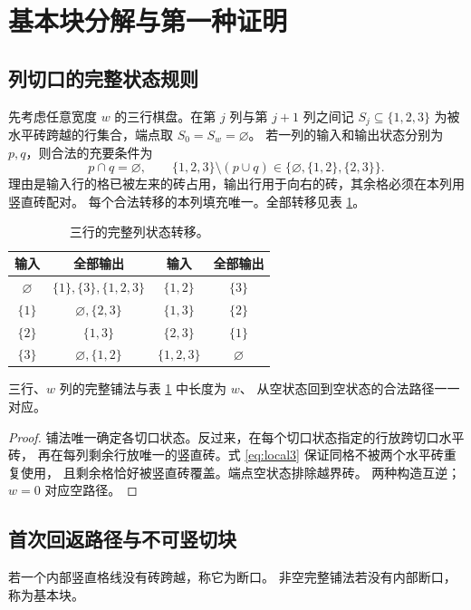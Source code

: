 \section{基本块分解与第一种证明}\label{sec:blocks}

\subsection{列切口的完整状态规则}
先考虑任意宽度 $w$ 的三行棋盘。在第 $j$ 列与第 $j+1$ 列之间记
$S_j\subseteq\{1,2,3\}$ 为被水平砖跨越的行集合，端点取
$S_0=S_w=\varnothing$。
若一列的输入和输出状态分别为 $p,q$，则合法的充要条件为
\begin{equation}\label{eq:local3}
 p\cap q=\varnothing,\qquad
 \{1,2,3\}\setminus(p\cup q)\in
 \{\varnothing,\{1,2\},\{2,3\}\}.
\end{equation}
理由是输入行的格已被左来的砖占用，输出行用于向右的砖，其余格必须在本列用竖直砖配对。
每个合法转移的本列填充唯一。全部转移见表 \ref{tab:states}。

\begin{table}[htbp]
\centering
\caption{三行的完整列状态转移。}\label{tab:states}
\begin{tabular}{cc@{\qquad}cc}
\toprule
输入 & 全部输出 & 输入 & 全部输出\\
\midrule
$\varnothing$ & $\{1\},\{3\},\{1,2,3\}$ &
$\{1,2\}$ & $\{3\}$\\
$\{1\}$ & $\varnothing,\{2,3\}$ &
$\{1,3\}$ & $\{2\}$\\
$\{2\}$ & $\{1,3\}$ &
$\{2,3\}$ & $\{1\}$\\
$\{3\}$ & $\varnothing,\{1,2\}$ &
$\{1,2,3\}$ & $\varnothing$\\
\bottomrule
\end{tabular}
\end{table}

\begin{lemma}\label{lem:path}
三行、$w$ 列的完整铺法与表 \ref{tab:states} 中长度为 $w$、
从空状态回到空状态的合法路径一一对应。
\end{lemma}
\begin{proof}
铺法唯一确定各切口状态。反过来，在每个切口状态指定的行放跨切口水平砖，
再在每列剩余行放唯一的竖直砖。式 \eqref{eq:local3} 保证同格不被两个水平砖重复使用，
且剩余格恰好被竖直砖覆盖。端点空状态排除越界砖。
两种构造互逆；$w=0$ 对应空路径。
\end{proof}

\subsection{首次回返路径与不可竖切块}
\begin{definition}
若一个内部竖直格线没有砖跨越，称它为断口。
非空完整铺法若没有内部断口，称为基本块。
\end{definition}

